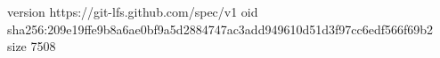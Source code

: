 version https://git-lfs.github.com/spec/v1
oid sha256:209e19ffe9b8a6ae0bf9a5d2884747ac3add949610d51d3f97cc6edf566f69b2
size 7508
